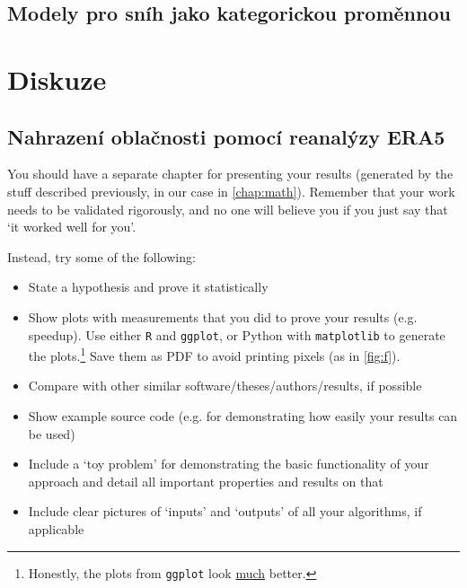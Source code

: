 \subsection{Modely pro sníh jako kategorickou proměnnou}

\section{Diskuze}

\subsection{Nahrazení oblačnosti pomocí reanalýzy ERA5}

You should have a separate chapter for presenting your results (generated by the stuff described previously, in our case in \cref{chap:math}). Remember that your work needs to be validated rigorously, and no one will believe you if you just say that `it worked well for you'.

Instead, try some of the following:
\begin{itemize}
\item State a hypothesis and prove it statistically
\item Show plots with measurements that you did to prove your results (e.g. speedup). Use either \texttt{R} and \texttt{ggplot}, or Python with \texttt{matplotlib} to generate the plots.\footnote{Honestly, the plots from \texttt{ggplot} look \underline{much} better.} Save them as PDF to avoid printing pixels (as in \cref{fig:f}).
\item Compare with other similar software/theses/authors/results, if possible
\item Show example source code (e.g. for demonstrating how easily your results can be used)
\item Include a `toy problem' for demonstrating the basic functionality of your approach and detail all important properties and results on that
\item Include clear pictures of `inputs' and `outputs' of all your algorithms, if applicable
\end{itemize}

